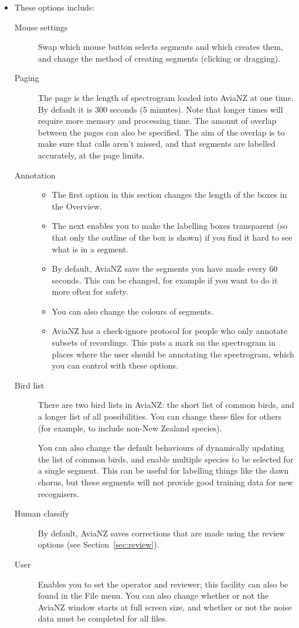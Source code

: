 \documentclass{article}
\begin{document}
\begin{itemize}
\item These options include:
\begin{description}
\item[Mouse settings] Swap which mouse button selects segments and which creates them, and change the method of creating segments (clicking or dragging).
\item[Paging] The page is the length of spectrogram loaded into AviaNZ at one time. By default it is 300 seconds (5 minutes). Note that longer times will require more memory and processing time. The amount of overlap between the pages can also be specified. The aim of the overlap is to make sure that calls aren't missed, and that segments are labelled accurately, at the page limits. 
\item[Annotation] 
\begin{itemize}
\item The first option in this section changes the length of the boxes in the Overview. 
\item The next enables you to make the labelling boxes transparent (so that only the outline of the box is shown) if you find it hard to see what is in a segment. 
\item By default, AviaNZ save the segments you have made every 60 seconds. This can be changed, for example if you want to do it more often for safety. 
\item You can also change the colours of segments.
\item AviaNZ has a check-ignore protocol for people who only annotate subsets of recordings. This puts a mark on the spectrogram in places where the user should be annotating the spectrogram, which you can control with these options.
\end{itemize}
\item[Bird list] There are two bird lists in AviaNZ: the short list of common birds, and a longer list of all possibilities. You can change these files for others (for example, to include non-New Zealand species). %

You can also change the default behaviours of dynamically updating the list of common birds, and enable multiple species to be selected for a single segment. This can be useful for labelling things like the dawn chorus, but these segments will not provide good training data for new recognisers. 
\item[Human classify] By default, AviaNZ saves corrections that are made using the review options (see Section~\ref{sec:review}). 
\item[User] Enables you to set the operator and reviewer; this facility can also be found in the File menu. You can also change whether or not the AviaNZ window starts at full screen size, and whether or not the noise data must be completed for all files. 
\end{description}
\end{itemize}
\end{document}
